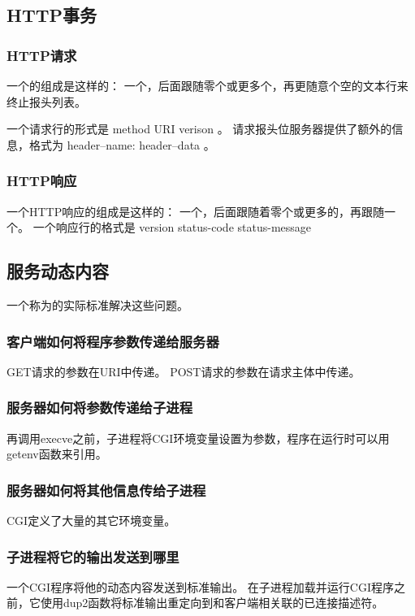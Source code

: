 {    \subsection{HTTP事务}
    {
        \subsubsection{HTTP请求}
        {
            一个的组成是这样的：
            一个，后面跟随零个或更多个，再更随意个空的文本行来终止报头列表。

            一个请求行的形式是 method URI verison 。
            请求报头位服务器提供了额外的信息，格式为 header--name: header--data 。
        }

        \subsubsection{HTTP响应}
        {
            一个HTTP响应的组成是这样的：
            一个，后面跟随着零个或更多的，再跟随一个。
            一个响应行的格式是 version status-code status-message
        }
    }

    \subsection{服务动态内容}
    {
        一个称为的实际标准解决这些问题。

        \subsubsection{客户端如何将程序参数传递给服务器}
        {
            GET请求的参数在URI中传递。
            POST请求的参数在请求主体中传递。
        }

        \subsubsection{服务器如何将参数传递给子进程}
        {
            再调用execve之前，子进程将CGI环境变量设置为参数，程序在运行时可以用getenv函数来引用。
        }

        \subsubsection{服务器如何将其他信息传给子进程}
        {
            CGI定义了大量的其它环境变量。
        }

        \subsubsection{子进程将它的输出发送到哪里}
        {
            一个CGI程序将他的动态内容发送到标准输出。
            在子进程加载并运行CGI程序之前，它使用dup2函数将标准输出重定向到和客户端相关联的已连接描述符。
        }
    }
}
